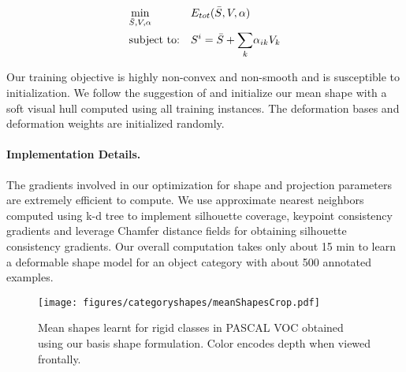 \begin{equation}
\begin{aligned}
\eqlabel{optimization}
& \underset{\bar{S},V,\alpha}{\text{min}}
& & E_{tot}(\bar{S},V,\alpha) \\
& \text{subject to:}
& & S^i = \bar{S} + \underset{k}{\sum}\alpha_{ik} V_k
\end{aligned}
\end{equation}

Our training objective is highly non-convex and  non-smooth and is susceptible to initialization. We follow the suggestion of \cite{esteban2004snake} and initialize our mean shape with a soft visual hull computed using all training instances. The deformation bases and deformation weights are initialized randomly. 


\paragraph{Implementation Details.}
The gradients involved in our optimization for shape and projection parameters are extremely efficient to compute. We use approximate nearest neighbors computed using k-d tree to implement silhouette coverage,  keypoint consistency gradients and leverage Chamfer distance fields for obtaining silhouette consistency gradients. Our overall computation takes only about 15 min to learn a deformable shape model for an object category with about 500 annotated examples.

\begin{figure}[htb!]
\centering
  \texttt{[image: figures/categoryshapes/meanShapesCrop.pdf]}
  \caption{Mean shapes learnt for rigid classes in PASCAL VOC obtained using our basis shape formulation. Color encodes depth when viewed frontally.}
  \label{fig:meanDense}
\end{figure}
